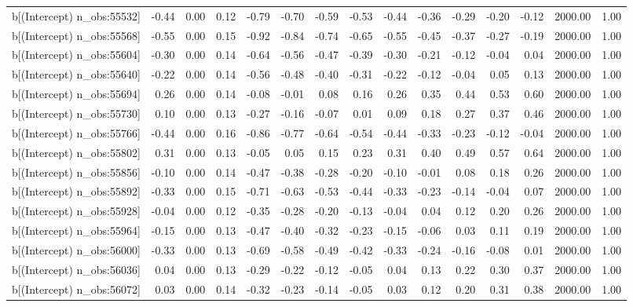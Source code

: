 \begin{table}[ht]
\begin{tabular}{rrrrrrrrrrrrrrr}
  b[(Intercept) n\_obs:55532] & -0.44 & 0.00 & 0.12 & -0.79 & -0.70 & -0.59 & -0.53 & -0.44 & -0.36 & -0.29 & -0.20 & -0.12 & 2000.00 & 1.00 \\ 
  b[(Intercept) n\_obs:55568] & -0.55 & 0.00 & 0.15 & -0.92 & -0.84 & -0.74 & -0.65 & -0.55 & -0.45 & -0.37 & -0.27 & -0.19 & 2000.00 & 1.00 \\ 
  b[(Intercept) n\_obs:55604] & -0.30 & 0.00 & 0.14 & -0.64 & -0.56 & -0.47 & -0.39 & -0.30 & -0.21 & -0.12 & -0.04 & 0.04 & 2000.00 & 1.00 \\ 
  b[(Intercept) n\_obs:55640] & -0.22 & 0.00 & 0.14 & -0.56 & -0.48 & -0.40 & -0.31 & -0.22 & -0.12 & -0.04 & 0.05 & 0.13 & 2000.00 & 1.00 \\ 
  b[(Intercept) n\_obs:55694] & 0.26 & 0.00 & 0.14 & -0.08 & -0.01 & 0.08 & 0.16 & 0.26 & 0.35 & 0.44 & 0.53 & 0.60 & 2000.00 & 1.00 \\ 
  b[(Intercept) n\_obs:55730] & 0.10 & 0.00 & 0.13 & -0.27 & -0.16 & -0.07 & 0.01 & 0.09 & 0.18 & 0.27 & 0.37 & 0.46 & 2000.00 & 1.00 \\ 
  b[(Intercept) n\_obs:55766] & -0.44 & 0.00 & 0.16 & -0.86 & -0.77 & -0.64 & -0.54 & -0.44 & -0.33 & -0.23 & -0.12 & -0.04 & 2000.00 & 1.00 \\ 
  b[(Intercept) n\_obs:55802] & 0.31 & 0.00 & 0.13 & -0.05 & 0.05 & 0.15 & 0.23 & 0.31 & 0.40 & 0.49 & 0.57 & 0.64 & 2000.00 & 1.00 \\ 
  b[(Intercept) n\_obs:55856] & -0.10 & 0.00 & 0.14 & -0.47 & -0.38 & -0.28 & -0.20 & -0.10 & -0.01 & 0.08 & 0.18 & 0.26 & 2000.00 & 1.00 \\ 
  b[(Intercept) n\_obs:55892] & -0.33 & 0.00 & 0.15 & -0.71 & -0.63 & -0.53 & -0.44 & -0.33 & -0.23 & -0.14 & -0.04 & 0.07 & 2000.00 & 1.00 \\ 
  b[(Intercept) n\_obs:55928] & -0.04 & 0.00 & 0.12 & -0.35 & -0.28 & -0.20 & -0.13 & -0.04 & 0.04 & 0.12 & 0.20 & 0.26 & 2000.00 & 1.00 \\ 
  b[(Intercept) n\_obs:55964] & -0.15 & 0.00 & 0.13 & -0.47 & -0.40 & -0.32 & -0.23 & -0.15 & -0.06 & 0.03 & 0.11 & 0.19 & 2000.00 & 1.00 \\ 
  b[(Intercept) n\_obs:56000] & -0.33 & 0.00 & 0.13 & -0.69 & -0.58 & -0.49 & -0.42 & -0.33 & -0.24 & -0.16 & -0.08 & 0.01 & 2000.00 & 1.00 \\ 
  b[(Intercept) n\_obs:56036] & 0.04 & 0.00 & 0.13 & -0.29 & -0.22 & -0.12 & -0.05 & 0.04 & 0.13 & 0.22 & 0.30 & 0.37 & 2000.00 & 1.00 \\ 
  b[(Intercept) n\_obs:56072] & 0.03 & 0.00 & 0.14 & -0.32 & -0.23 & -0.14 & -0.05 & 0.03 & 0.12 & 0.20 & 0.31 & 0.38 & 2000.00 & 1.00 \\ 

\end{tabular}
\end{table}
